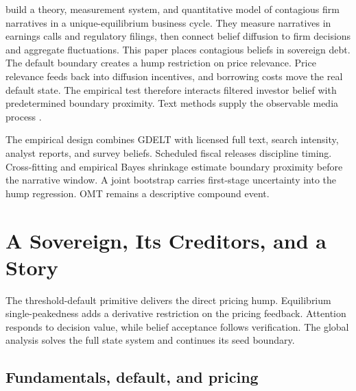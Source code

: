\documentclass[11pt]{article}
\theoremstyle{definition}
\begin{document}
\citet{FlynnSastry2024} build a theory, measurement system, and quantitative model of contagious firm narratives in a unique-equilibrium business cycle. They measure narratives in earnings calls and regulatory filings, then connect belief diffusion to firm decisions and aggregate fluctuations. This paper places contagious beliefs in sovereign debt. The default boundary creates a hump restriction on price relevance. Price relevance feeds back into diffusion incentives, and borrowing costs move the real default state. The empirical test therefore interacts filtered investor belief with predetermined boundary proximity. Text methods supply the observable media process \citep{GentzkowKellyTaddy2019}.

The empirical design combines GDELT with licensed full text, search intensity, analyst reports, and survey beliefs. Scheduled fiscal releases discipline timing. Cross-fitting and empirical Bayes shrinkage estimate boundary proximity before the narrative window. A joint bootstrap carries first-stage uncertainty into the hump regression. OMT remains a descriptive compound event.

\section{A Sovereign, Its Creditors, and a Story}\label{sec:model}

The threshold-default primitive delivers the direct pricing hump. Equilibrium single-peakedness adds a derivative restriction on the pricing feedback. Attention responds to decision value, while belief acceptance follows verification. The global analysis solves the full state system and continues its seed boundary.

\subsection{Fundamentals, default, and pricing}
\end{document}
